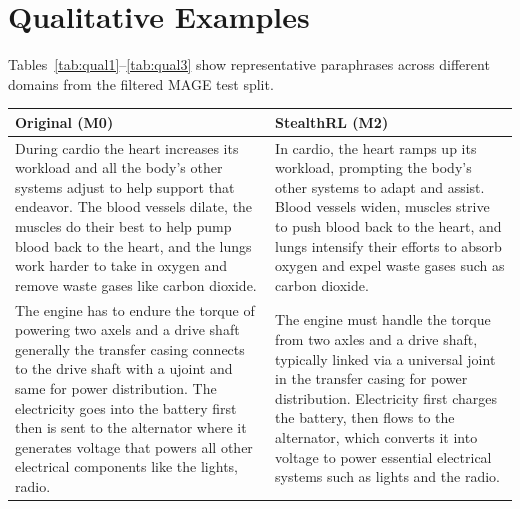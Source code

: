 \documentclass[11pt]{article}
\begin{document}
\FloatBarrier
\section{Qualitative Examples}
\label{app:examples}

Tables~\ref{tab:qual1}--\ref{tab:qual3} show representative paraphrases across different domains from the filtered MAGE test split.

\begin{center}
\footnotesize
\setlength{\tabcolsep}{4pt}
\begin{tabularx}{\columnwidth}{>{\raggedright\arraybackslash}X >{\raggedright\arraybackslash}X}
\toprule
\textbf{Original (M0)} & \textbf{StealthRL (M2)} \\
\midrule
During cardio the heart increases its workload and all the body's other systems adjust to help support that endeavor. The blood vessels dilate, the muscles do their best to help pump blood back to the heart, and the lungs work harder to take in oxygen and remove waste gases like carbon dioxide. &
In cardio, the heart ramps up its workload, prompting the body's other systems to adapt and assist. Blood vessels widen, muscles strive to push blood back to the heart, and lungs intensify their efforts to absorb oxygen and expel waste gases such as carbon dioxide. \\
\midrule
The engine has to endure the torque of powering two axels and a drive shaft generally the transfer casing connects to the drive shaft with a ujoint and same for power distribution. The electricity goes into the battery first then is sent to the alternator where it generates voltage that powers all other electrical components like the lights, radio. &
The engine must handle the torque from two axles and a drive shaft, typically linked via a universal joint in the transfer casing for power distribution. Electricity first charges the battery, then flows to the alternator, which converts it into voltage to power essential electrical systems such as lights and the radio. \\
\bottomrule
\end{tabularx}
\label{tab:qual1}
\end{center}
\end{document}
